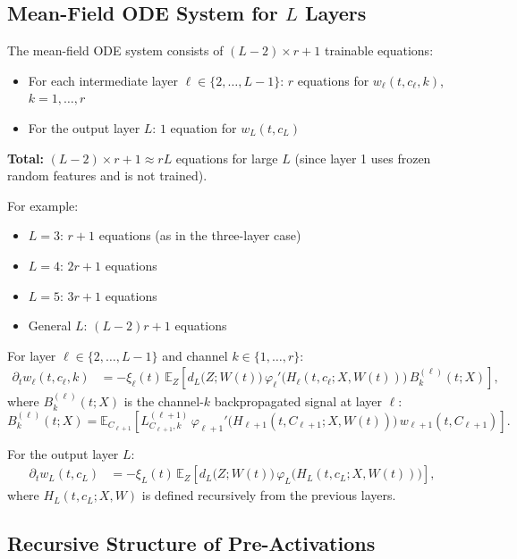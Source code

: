 \documentclass[11pt]{article}
\newcommand{\E}{\mathbb{E}}
\newcommand{\1}{\mathbbm{1}}
\begin{document}
\subsection{Mean-Field ODE System for $L$ Layers}

The mean-field ODE system consists of $(L-2)\times r + 1$ trainable equations:
\begin{itemize}
\item For each intermediate layer $\ell\in\{2,\dots,L-1\}$: $r$ equations for $w_\ell(t,c_\ell,k)$, $k=1,\dots,r$
\item For the output layer $L$: $1$ equation for $w_L(t,c_L)$
\end{itemize}

\textbf{Total:} $(L-2)\times r + 1 \approx rL$ equations for large $L$ (since layer 1 uses frozen random features and is not trained).

For example:
\begin{itemize}
\item $L=3$: $r+1$ equations (as in the three-layer case)
\item $L=4$: $2r+1$ equations
\item $L=5$: $3r+1$ equations
\item General $L$: $(L-2)r+1$ equations
\end{itemize}

For layer $\ell\in\{2,\dots,L-1\}$ and channel $k\in\{1,\dots,r\}$:
\begin{align}
\partial_t w_\ell(t,c_\ell,k) &= -\xi_\ell(t)\,\E_{Z}\!\left[d_L\big(Z;W(t)\big)\,\varphi_\ell'\!\Big(H_\ell(t,c_\ell;X,W(t))\Big)\,B_k^{(\ell)}(t;X)\right], \label{eq:ode-wl}
\end{align}
where $B_k^{(\ell)}(t;X)$ is the channel-$k$ backpropagated signal at layer $\ell$:
\[
B_k^{(\ell)}(t;X)=\E_{C_{\ell+1}}\!\left[L^{(\ell+1)}_{C_{\ell+1},k}\,\varphi_{\ell+1}'\!\Big(H_{\ell+1}(t,C_{\ell+1};X,W(t))\Big)\,w_{\ell+1}(t,C_{\ell+1})\right].
\]

For the output layer $L$:
\begin{align}
\partial_t w_L(t,c_L) &= -\xi_L(t)\,\E_{Z}\!\left[d_L\big(Z;W(t)\big)\,\varphi_L\!\Big(H_L(t,c_L;X,W(t))\Big)\right], \label{eq:ode-wL}
\end{align}
where $H_L(t,c_L;X,W)$ is defined recursively from the previous layers.

\subsection{Recursive Structure of Pre-Activations}
\end{document}
